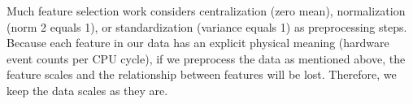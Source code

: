 Much feature selection work considers centralization (zero mean), normalization (norm 2 equals 1), or standardization (variance equals 1) as preprocessing steps. Because each feature in our data has an explicit physical meaning (hardware event counts per CPU cycle), if we preprocess the data as mentioned above, the feature scales and the relationship between features will be lost. Therefore, we keep the data scales as they are.
